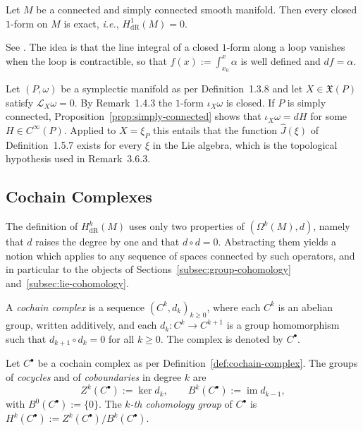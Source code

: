 \begin{proposition}\label{prop:simply-connected}
	Let $M$ be a connected and simply connected smooth manifold. Then every closed $1$-form on $M$ is exact, \textit{i.e.}, $H^1_{\mathrm{dR}}(M)=0$.
\end{proposition}

\noindent See \cite[TODO-location]{TODO-Lee13}. The idea is that the line integral of a closed $1$-form along a loop vanishes when the loop is contractible, so that $f(x):=\int_{x_0}^x\alpha$ is well defined and $df=\alpha$.

\begin{remark}\label{rem:momentum-existence}
	Let $(P,\omega)$ be a symplectic manifold as per Definition~1.3.8 and let $X\in\mathfrak{X}(P)$ satisfy $\mathcal{L}_X\omega=0$. By Remark~1.4.3 the $1$-form $\iota_X\omega$ is closed. If $P$ is simply connected, Proposition~\ref{prop:simply-connected} shows that $\iota_X\omega=dH$ for some $H\in C^\infty(P)$. Applied to $X=\xi_P$ this entails that the function $\hat J(\xi)$ of Definition~1.5.7 exists for every $\xi$ in the Lie algebra, which is the topological hypothesis used in Remark~3.6.3.
\end{remark}

\subsection{Cochain Complexes}\label{subsec:cochain}

The definition of $H^k_{\mathrm{dR}}(M)$ uses only two properties of $(\Omega^k(M),d)$, namely that $d$ raises the degree by one and that $d\circ d=0$. Abstracting them yields a notion which applies to any sequence of spaces connected by such operators, and in particular to the objects of Sections~\ref{subsec:group-cohomology} and~\ref{subsec:lie-cohomology}.

\begin{definition}\label{def:cochain-complex}
	A \emph{cochain complex} is a sequence $(C^k, d_k)_{k\geq0}$, where each $C^k$ is an abelian group, written additively, and each $d_k:C^k\to C^{k+1}$ is a group homomorphism such that $d_{k+1}\circ d_k=0$ for all $k\geq0$. The complex is denoted by $C^\bullet$.
\end{definition}

\begin{definition}\label{def:abstract-cohomology}
	Let $C^\bullet$ be a cochain complex as per Definition~\ref{def:cochain-complex}. The groups of \emph{cocycles} and of \emph{coboundaries} in degree $k$ are
	\begin{equation*}
		Z^k(C^\bullet):=\ker{d}_k, \qquad B^k(C^\bullet):=\operatorname{im} d_{k-1},
	\end{equation*}
	with $B^0(C^\bullet):=\{0\}$. The \emph{$k$-th cohomology group} of $C^\bullet$ is $H^k(C^\bullet):=Z^k(C^\bullet)/B^k(C^\bullet)$.
\end{definition}

